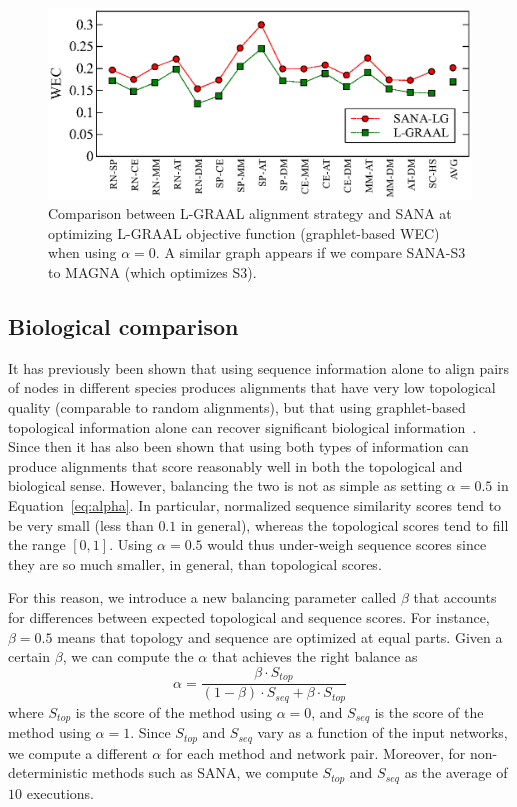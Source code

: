 \documentclass{bioinfo}
\begin{document}
\begin{figure}
\centering
\includegraphics[width=0.99\linewidth]{biogridBeta0wec.eps}
\caption{Comparison between L-GRAAL alignment strategy and SANA at optimizing L-GRAAL objective function (graphlet-based WEC) when using $\alpha=0$. A similar graph appears if we compare SANA-S3 to MAGNA (which optimizes S3).}
\label{fig:lgraalobjfuncomparison}
\end{figure}

\subsection{Biological comparison}\label{bio}

It has previously been shown that using sequence information alone to align pairs of nodes in different species produces alignments that have very low topological quality (comparable to random alignments), but that using graphlet-based topological information alone can recover significant biological information~\citep{GRAAL}. Since then it has also been shown that using both types of information can produce alignments that score reasonably well in both the topological and biological sense. However, balancing the two is not as simple as setting $\alpha=0.5$ in Equation~\ref{eq:alpha}. In particular, normalized sequence similarity scores tend to be very small (less than $0.1$ in general), whereas the topological scores tend to fill the range $[0,1]$. Using $\alpha=0.5$ would thus under-weigh sequence scores since they are so much smaller, in general, than topological scores.

For this reason, we introduce a new balancing parameter called $\beta$ that accounts for differences between expected topological and sequence scores. For instance, $\beta=0.5$ means that topology and sequence are optimized at equal parts. Given a certain $\beta$, we can compute the $\alpha$ that achieves the right balance as
$$\alpha = \frac{\beta\cdot S_{top}}{(1-\beta)\cdot S_{seq}+\beta\cdot S_{top}}$$
where $S_{top}$ is the score of the method using $\alpha=0$, and $S_{seq}$ is the score of the method using $\alpha=1$. Since $S_{top}$ and $S_{seq}$ vary as a function of the input networks, we compute a different $\alpha$ for each method and network pair. Moreover, for non-deterministic methods such as SANA, we compute $S_{top}$ and $S_{seq}$ as the average of $10$ executions.
\end{document}

